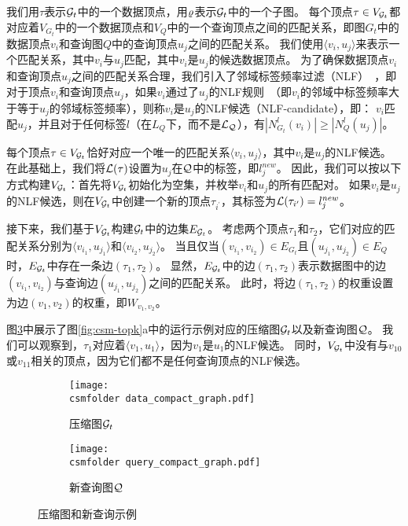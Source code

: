 我们用$\tau$表示$\mathcal{G}_t$中的一个数据顶点，用$\varrho$表示$\mathcal{G}_t$中的一个子图。
每个顶点$\tau \in V_{\mathcal{G}_t}$都对应着$V_{G_t}$中的一个数据顶点和$V_Q$中的一个查询顶点之间的匹配关系，即图$G_t$中的数据顶点$v_i$和查询图$Q$中的查询顶点$u_j$之间的匹配关系。
我们使用$\langle v_i, u_j \rangle$来表示一个匹配关系，其中$v_i$与$u_j$匹配，其中$v_i$是$u_j$的候选数据顶点。
为了确保数据顶点$v_i$和查询顶点$u_j$之间的匹配关系合理，我们引入了邻域标签频率过滤（NLF）~\cite{sgi-turbo-iso-DBLP:conf/sigmod/HanLL13}，即对于顶点$v_i$和查询顶点$u_j$，如果$v_i$通过了$u_j$的NLF规则~\cite{sgi-turbo-iso-DBLP:conf/sigmod/HanLL13}（即$v_i$的邻域中标签频率大于等于$u_j$的邻域标签频率），则称$v_i$是$u_j$的NLF候选（NLF-candidate），即：
$v_i$匹配$u_j$，并且对于任何标签$l$（在$L_Q$下，而不是$\mathcal{L}_{\mathcal{Q}}$），有$|N_{G_t}^l(v_i)| \geq |N_Q^l(u_j)|$。

每个顶点$\tau \in V_{\mathcal{G}_t}$恰好对应一个唯一的匹配关系$\langle v_i, u_j \rangle$，其中$v_i$是$u_j$的NLF候选。
在此基础上，我们将$\mathcal{L}(\tau)$设置为$u_j$在$\mathcal{Q}$中的标签，即$l_j^{new}$。
因此，我们可以按以下方式构建$V_{\mathcal{G}_t}$：首先将$V_{\mathcal{G}_t}$初始化为空集，并枚举$v_i$和$u_j$的所有匹配对。
如果$v_i$是$u_j$的NLF候选，则在$V_{\mathcal{G}_t}$中创建一个新的顶点$\tau_{i^\prime}$，其标签为$\mathcal{L}(\tau_{i^\prime}) = l_j^{new}$。

接下来，我们基于$V_{\mathcal{G}_t}$构建$\mathcal{G}_t$中的边集$E_{\mathcal{G}_t}$。
考虑两个顶点$\tau_1$和$\tau_2$，它们对应的匹配关系分别为$\langle v_{i_1}, u_{j_1} \rangle$和$\langle v_{i_2}, u_{j_2} \rangle$。
当且仅当$(v_{i_1}, v_{i_2}) \in E_{G_t}$且$(u_{j_1}, u_{j_2}) \in E_Q$时，$E_{\mathcal{G}_t}$中存在一条边$(\tau_1, \tau_2)$。
显然，$E_{\mathcal{G}_t}$中的边$(\tau_1, \tau_2)$表示数据图中的边$(v_{i_1}, v_{i_2})$与查询边$(u_{j_1}, u_{j_2})$之间的匹配关系。
此时，将边$(\tau_1, \tau_2)$的权重设置为边$(v_1, v_2)$的权重，即$W_{v_1, v_2}$。

图\ref{fig:compact}中展示了图\ref{fig:csm-topk}a中的运行示例对应的压缩图$\mathcal{G}_t$以及新查询图$\mathcal{Q}$。
我们可以观察到，$\tau_1$对应着$\langle v_1, u_1 \rangle$，因为$v_1$是$u_1$的NLF候选。
同时，$V_{\mathcal{G}_t}$中没有与$v_{10}$或$v_{11}$相关的顶点，因为它们都不是任何查询顶点的NLF候选。

\begin{figure}[h!]
\def\wscorevone{0.62}
\centering
\begin{subfigure}[t]{\wscorevone\linewidth}
\centering
\resizebox{\linewidth}{!}
{
\texttt{[image: \\csmfolder data\_compact\_graph.pdf]}
}
\caption{压缩图$\mathcal{G}_t$}
\label{fig:data_compact_graph}
\end{subfigure}
\begin{subfigure}[t]{0.35\linewidth}
\centering
\resizebox{\linewidth}{!}
{
\texttt{[image: \\csmfolder query\_compact\_graph.pdf]}
}
\caption{新查询图$\mathcal{Q}$}
\label{fig:query_compact_graph}
\end{subfigure}
\caption{压缩图和新查询示例}
\label{fig:compact}
\end{figure}


